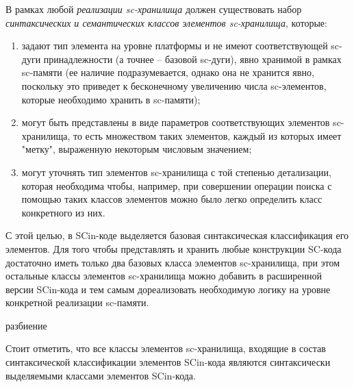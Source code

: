 В рамках любой \textit{реализации sc-хранилища} должен существовать набор \textit{синтаксических и семантических классов элементов sc-хранилища}, которые:
\begin{enumerate}
    \item задают тип элемента на уровне платформы и не имеют соответствующей sc-дуги принадлежности (а точнее -- базовой sc-дуги), явно хранимой в рамках sc-памяти (ее наличие подразумевается, однако она не хранится явно, поскольку это приведет к бесконечному увеличению числа sc-элементов, которые необходимо хранить в sc-памяти);
    \item могут быть представлены в виде параметров соответствующих элементов sc-хранилища, то есть множеством таких элементов, каждый из которых имеет "метку", выраженную некоторым числовым значением;
    \item могут уточнять тип элементов sc-хранилища с той степенью детализации, которая необходима чтобы, например, при совершении операции поиска с помощью таких классов элементов можно было легко определить класс конкретного из них.
\end{enumerate}

С этой целью, в SCin-коде выделяется базовая синтаксическая классификация его элементов. Для того чтобы представлять и хранить любые конструкции SC-кода достаточно иметь только два базовых класса элементов sc-хранилища, при этом остальные классы элементов sc-хранилища можно добавить в расширенной версии SCin-кода и тем самым дореализовать необходимую логику на уровне конкретной реализации sc-памяти.

\begin{SCn}
\begin{scnsubstruct}

\begin{scnrelfromset}{разбиение}
\end{scnrelfromset}

\end{scnsubstruct}
\end{SCn}

Стоит отметить, что все классы элементов sc-хранилища, входящие в состав синтаксической классификации элементов SCin-кода являются синтаксически выделяемыми классами элементов SCin-кода.

